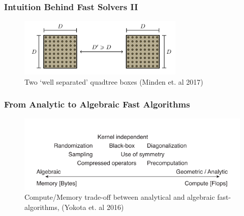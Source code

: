 \begin{frame}
    \frametitle{Intuition Behind Fast Solvers II}
        \begin{figure}
            \includegraphics[width=0.7\textwidth]{assets/well_separated.png}
            \caption*{Two `well separated' quadtree boxes (Minden et. al 2017)}
        \end{figure}


\end{frame}


\begin{frame}
    \frametitle{From Analytic to Algebraic Fast Algorithms}

    \begin{figure}
        \includegraphics[width=\textwidth]{assets/analytical_algebraic.png}
        \caption*{Compute/Memory trade-off between analytical and algebraic fast-algorithms, (Yokota et. al 2016)}
    \end{figure}

\end{frame}


